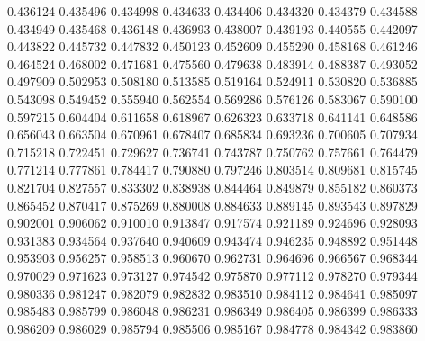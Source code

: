 0.436124
0.435496
0.434998
0.434633
0.434406
0.434320
0.434379
0.434588
0.434949
0.435468
0.436148
0.436993
0.438007
0.439193
0.440555
0.442097
0.443822
0.445732
0.447832
0.450123
0.452609
0.455290
0.458168
0.461246
0.464524
0.468002
0.471681
0.475560
0.479638
0.483914
0.488387
0.493052
0.497909
0.502953
0.508180
0.513585
0.519164
0.524911
0.530820
0.536885
0.543098
0.549452
0.555940
0.562554
0.569286
0.576126
0.583067
0.590100
0.597215
0.604404
0.611658
0.618967
0.626323
0.633718
0.641141
0.648586
0.656043
0.663504
0.670961
0.678407
0.685834
0.693236
0.700605
0.707934
0.715218
0.722451
0.729627
0.736741
0.743787
0.750762
0.757661
0.764479
0.771214
0.777861
0.784417
0.790880
0.797246
0.803514
0.809681
0.815745
0.821704
0.827557
0.833302
0.838938
0.844464
0.849879
0.855182
0.860373
0.865452
0.870417
0.875269
0.880008
0.884633
0.889145
0.893543
0.897829
0.902001
0.906062
0.910010
0.913847
0.917574
0.921189
0.924696
0.928093
0.931383
0.934564
0.937640
0.940609
0.943474
0.946235
0.948892
0.951448
0.953903
0.956257
0.958513
0.960670
0.962731
0.964696
0.966567
0.968344
0.970029
0.971623
0.973127
0.974542
0.975870
0.977112
0.978270
0.979344
0.980336
0.981247
0.982079
0.982832
0.983510
0.984112
0.984641
0.985097
0.985483
0.985799
0.986048
0.986231
0.986349
0.986405
0.986399
0.986333
0.986209
0.986029
0.985794
0.985506
0.985167
0.984778
0.984342
0.983860
